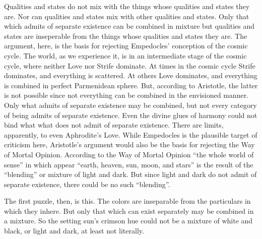 Qualities and states do not mix with the things whose qualities and states they are. Nor can qualities and states mix with other qualities and states. Only that which admits of separate existence can be combined in mixture but qualities and states are inseperable from the things whose qualities and states they are. The argument, here, is the basis for rejecting Empedocles' conception of the cosmic cycle. The world, as we experience it, is in an intermediate stage of the cosmic cycle, where neither Love nor Strife dominate. At times in the cosmic cycle Strife dominates, and everything is scattered. At others Love dominates, and everything is combined in perfect Parmenidean sphere. But, according to Aristotle, the latter is not possible since not everything can be combined in the envisioned manner. Only what admits of separate existence may be combined, but not every category of being admits of separate existence. Even the divine glues of harmony could not bind what what does not admit of separate existence. There are limits, apparently, to even Aphrodite's Love. While Empedocles is the plausible target of criticism here, Aristotle's argument would also be the basis for rejecting the Way of Mortal Opinion. According to the Way of Mortal Opinion ``the whole world of sense'' in which appear ``earth, heaven, sun, moon, and stars'' is the result of the ``blending'' or mixture of light and dark. But since light and dark do not admit of separate existence, there could be no such ``blending''. 

The first puzzle, then, is this. The colors are inseparable from the particulars in which they inhere. But only that which can exist separately may be combined in a mixture. So the setting sun's crimson hue could not be a mixture of white and black, or light and dark, at least not literally.


